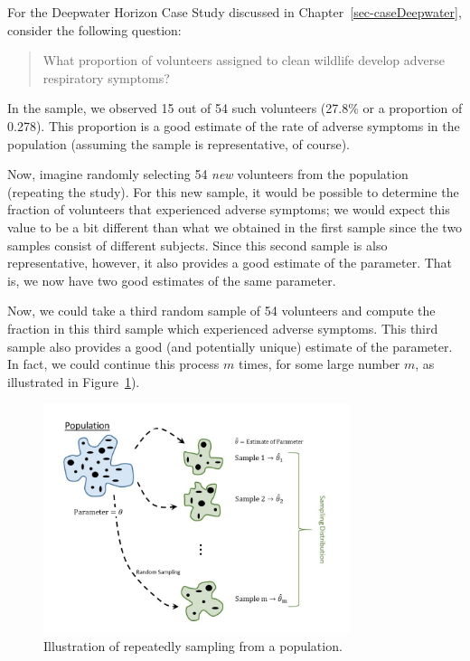 \documentclass[
  letterpaper,
  DIV=11,
  numbers=noendperiod]{scrreprt}
\theoremstyle{plain}
\theoremstyle{definition}
\theoremstyle{definition}
\theoremstyle{remark}
\begin{document}
For the Deepwater Horizon Case Study discussed in
Chapter~\ref{sec-caseDeepwater}, consider the following question:

\begin{quote}
What proportion of volunteers assigned to clean wildlife develop adverse
respiratory symptoms?
\end{quote}

In the sample, we observed 15 out of 54 such volunteers (27.8\% or a
proportion of 0.278). This proportion is a good estimate of the rate of
adverse symptoms in the population (assuming the sample is
representative, of course).

Now, imagine randomly selecting 54 \emph{new} volunteers from the
population (repeating the study). For this new sample, it would be
possible to determine the fraction of volunteers that experienced
adverse symptoms; we would expect this value to be a bit different than
what we obtained in the first sample since the two samples consist of
different subjects. Since this second sample is also representative,
however, it also provides a good estimate of the parameter. That is, we
now have two good estimates of the same parameter.

Now, we could take a third random sample of 54 volunteers and compute
the fraction in this third sample which experienced adverse symptoms.
This third sample also provides a good (and potentially unique) estimate
of the parameter. In fact, we could continue this process \(m\) times,
for some large number \(m\), as illustrated in
Figure~\ref{fig-samplingdistns-sampling-distribution}).

\begin{figure}

{\centering \includegraphics[width=0.8\textwidth,height=\textheight]{./images/SamplingDistns-Sampling-Distribution.jpg}

}

\caption{\label{fig-samplingdistns-sampling-distribution}Illustration of
repeatedly sampling from a population.}

\end{figure}
\end{document}
